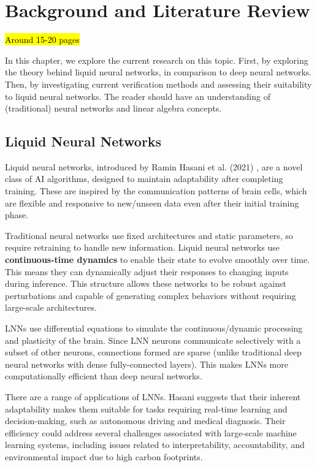 \chapter{Background and Literature Review}

\hl{Around 15-20 pages}

In this chapter, we explore the current research on this topic. First, by exploring the theory behind liquid neural networks, in comparison to deep neural networks. Then, by investigating current verification methods and assessing their suitability to liquid neural networks. The reader should have an understanding of (traditional) neural networks and linear algebra concepts.

\section{Liquid Neural Networks}

Liquid neural networks, introduced by Ramin Hasani et al. (2021) \cite{hasaniLiquidTimeconstantNetworks2021}, are a novel class of AI algorithms, designed to maintain adaptability after completing training. These are inspired by the communication patterns of brain cells, which are flexible and responsive to new/unseen data even after their initial training phase. 

Traditional neural networks use fixed architectures and static parameters, so require retraining to handle new information. Liquid neural networks use \textbf{continuous-time dynamics} to enable their state to evolve smoothly over time. This means they can dynamically adjust their responses to changing inputs during inference. This structure allows these networks to be robust against perturbations and capable of generating complex behaviors without requiring large-scale architectures.

LNNs use differential equations to simulate the continuous/dynamic processing and plasticity of the brain. Since LNN neurons communicate selectively with a subset of other neurons, connections formed are sparse (unlike traditional deep neural networks with dense fully-connected layers). This makes LNNs more computationally efficient than deep neural networks.

There are a range of applications of LNNs. Hasani suggests that their inherent adaptability makes them suitable for tasks requiring real-time learning and decision-making, such as autonomous driving and medical diagnosis. Their efficiency could address several challenges associated with large-scale machine learning systems, including issues related to interpretability, accountability, and environmental impact due to high carbon footprints. \cite{tedxtalksLiquidNeuralNetworks2023}

